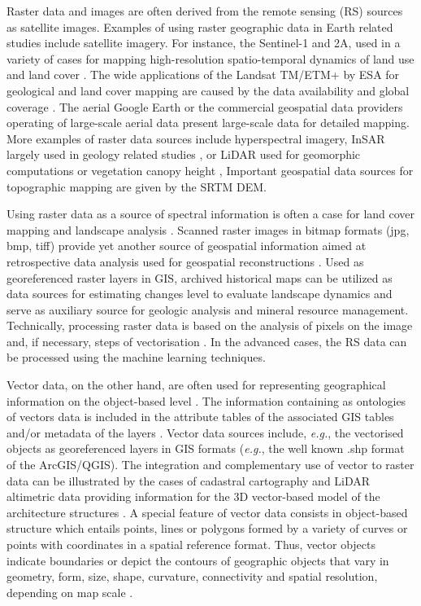\documentclass[data,article,submit,pdftex,moreauthors]{Definitions/mdpi}
\begin{document}
Raster data and images are often derived from the remote sensing (RS) sources as satellite images. Examples of using raster geographic data in Earth related studies include satellite imagery. For instance, the Sentinel-1 and 2A, used in a variety of cases for mapping high-resolution spatio-temporal dynamics of land use and land cover \cite{MERCIER2021107408,BALENZANO2021107345}. The wide applications of the Landsat TM/ETM+ by ESA for geological and land cover mapping are caused by the data availability and global coverage \cite{ALLENBY1987137,LOMBARDO,SAMARA}. The aerial Google Earth or the commercial geospatial data providers operating of large-scale aerial data present large-scale data for detailed mapping. More examples of raster data sources include hyperspectral imagery, InSAR largely used in geology related studies \cite{TALIB2022112793,LI2022114}, or LiDAR used for geomorphic computations or vegetation canopy height \cite{NEUGIRG2016269,NAKAO2022119953}, Important geospatial data sources for topographic mapping are given by the SRTM DEM. 

Using raster data as a source of spectral information is often a case for land cover mapping and landscape analysis \cite{SZABO2019104187,RUJOIUMARE2016244,LI2021112670}. Scanned raster images in bitmap formats (jpg, bmp, tiff) provide yet another source of geospatial information aimed at retrospective data analysis used for geospatial reconstructions \cite{KRAL2021107382,OSTAFIN2022107709}. Used as georeferenced raster layers in GIS, archived historical maps can be utilized as data sources for estimating changes level to evaluate landscape dynamics and serve as auxiliary source for geologic analysis and mineral resource management. Technically, processing raster  data is based on the analysis of pixels on the image and, if necessary, steps of vectorisation \cite{8937640,6723417,8810063}. In the advanced cases, the RS data can be processed using the machine learning techniques. 

Vector data, on the other hand, are often used for representing geographical information on the object-based level \cite{LI20121331,KOCH200623}. The information containing as ontologies of vectors data is included in the attribute tables of the associated GIS tables and/or metadata of the layers \cite{LI20121344}.
Vector data sources include, \emph{e.g.}, the vectorised objects as georeferenced layers in GIS formats (\emph{e.g.}, the well known .shp format of the ArcGIS/QGIS). The integration and complementary use of vector to raster data can be illustrated by the cases of cadastral cartography and LiDAR altimetric data providing information for the 3D vector-based model of the architecture structures \cite{VIANAFONS2020110258}. A special feature of vector data consists in object-based structure which entails points, lines or polygons formed by a variety of curves or points with coordinates in a spatial reference format. Thus, vector objects indicate boundaries or depict the contours of geographic objects that vary in geometry, form, size, shape, curvature, connectivity and spatial resolution, depending on map scale \cite{GULER2021107755}.
\end{document}
